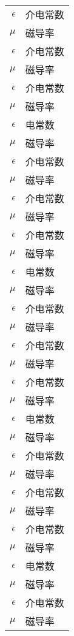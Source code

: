

\begin{nomenclature*}
\label{chap:symb}

\begin{longtable}{rl}
  $\epsilon$    & 介电常数 \\  
  $\mu$         & 磁导率 \\
  $\epsilon$    & 介电常数 \\
  $\mu$         & 磁导率 \\
  $\epsilon$    & 介电常数 \\
  $\mu$         & 磁导率 \\
  $\epsilon$    & 电常数 \\
  $\mu$         & 磁导率 \\
  $\epsilon$    & 介电常数 \\
  $\mu$         & 磁导率 \\
  $\epsilon$    & 介电常数 \\
  $\mu$         & 磁导率 \\
  $\epsilon$    & 介电常数 \\
  $\mu$         & 磁导率 \\
  $\epsilon$    & 电常数 \\
  $\mu$         & 磁导率 \\
  $\epsilon$    & 介电常数 \\
  $\mu$         & 磁导率 \\
  $\epsilon$    & 介电常数 \\
  $\mu$         & 磁导率 \\
  $\epsilon$    & 介电常数 \\
  $\mu$         & 磁导率 \\
  $\epsilon$    & 电常数 \\
  $\mu$         & 磁导率 \\
  $\epsilon$    & 介电常数 \\
  $\mu$         & 磁导率 \\
  $\epsilon$    & 介电常数 \\
  $\mu$         & 磁导率 \\
  $\epsilon$    & 介电常数 \\
  $\mu$         & 磁导率 \\
  $\epsilon$    & 电常数 \\
  $\mu$         & 磁导率 \\
  $\epsilon$    & 介电常数 \\
  $\mu$         & 磁导率 \\

\end{longtable}
\end{nomenclature*}
